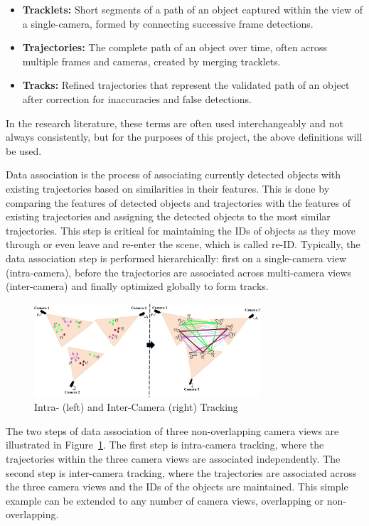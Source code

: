 \begin{itemize}
    \item \textbf{Tracklets:} Short segments of a path of an object captured within the view of a single-camera, formed by connecting successive frame detections.
    \item \textbf{Trajectories:} The complete path of an object over time, often across multiple frames and cameras, created by merging tracklets.
    \item \textbf{Tracks:} Refined trajectories that represent the validated path of an object after correction for inaccuracies and false detections.
\end{itemize}

In the research literature, these terms are often used interchangeably and not always consistently, but for the purposes of this project, the above definitions will be used.

Data association is the process of associating currently detected objects with existing trajectories based on similarities in their features. This is done by comparing the features of detected objects and trajectories with the features of existing trajectories and assigning the detected objects to the most similar trajectories. This step is critical for maintaining the IDs of objects as they move through or even leave and re-enter the scene, which is called re-ID. Typically, the data association step is performed hierarchically: first on a single-camera view (intra-camera), before the trajectories are associated across multi-camera views (inter-camera) and finally optimized globally to form tracks.

\begin{figure}[ht]
    \centering
    \includegraphics[width=0.75\textwidth]{resources/fig/Tesfaye19-intra_inter_camera_tracking.png}
    \caption[Intra- and Inter-Camera Tracking]{Intra- (left) and Inter-Camera (right) Tracking~\cite[source image:][Fig.~1]{Tesfaye19}}\label{fig:intra_inter_camera_tracking}
\end{figure}

The two steps of data association of three non-overlapping camera views are illustrated in Figure~\ref{fig:intra_inter_camera_tracking}. The first step is intra-camera tracking, where the trajectories within the three camera views are associated independently. The second step is inter-camera tracking, where the trajectories are associated across the three camera views and the IDs of the objects are maintained. This simple example can be extended to any number of camera views, overlapping or non-overlapping.

